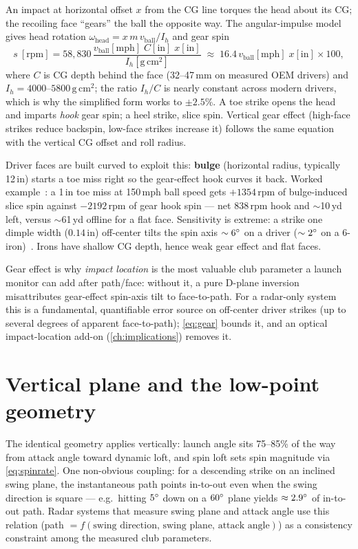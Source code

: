 An impact at horizontal offset $x$ from the CG line torques the head about
its CG; the recoiling face ``gears'' the ball the opposite way. The
angular-impulse model~\cite{tutelmangear} gives head rotation
$\omega_{\mathrm{head}} = x\,m\,v_{\mathrm{ball}}/I_h$ and gear spin
\begin{equation}
\label{eq:gear}
s\ [\mathrm{rpm}] = 58{,}830\,
  \frac{v_{\mathrm{ball}}[\mathrm{mph}]\; C[\mathrm{in}]\;
        x[\mathrm{in}]}{I_h[\mathrm{g\,cm^2}]}
\;\approx\; 16.4\, v_{\mathrm{ball}}[\mathrm{mph}]\;
   x[\mathrm{in}] \times 100,
\end{equation}
where $C$ is CG depth behind the face (32--47\,mm on measured OEM drivers)
and $I_h = 4000$--$5800\,\mathrm{g\,cm^2}$; the ratio $I_h/C$ is nearly
constant across modern drivers, which is why the simplified form works to
$\pm2.5\%$. A toe strike opens the head and imparts \emph{hook} gear spin;
a heel strike, slice spin. Vertical gear effect (high-face strikes reduce
backspin, low-face strikes increase it) follows the same equation with the
vertical CG offset and roll radius.

Driver faces are built curved to exploit this: \textbf{bulge} (horizontal
radius, typically 12\,in) starts a toe miss right so the gear-effect hook
curves it back. Worked example~\cite{tutelmangear}: a 1\,in toe miss at
150\,mph ball speed gets $+1354$\,rpm of bulge-induced slice spin against
$-2192$\,rpm of gear hook spin --- net 838\,rpm hook and $\sim$10\,yd left,
versus $\sim$61\,yd offline for a flat face. Sensitivity is extreme: a
strike one dimple width ($0.14$\,in) off-center tilts the spin axis
$\sim6\si{\degree}$ on a driver ($\sim2\si{\degree}$ on a 6-iron)~\cite{perfectgolfswing}.
Irons have shallow CG depth, hence weak gear effect and flat faces.

\begin{implication}
Gear effect is why \emph{impact location} is the most valuable club
parameter a launch monitor can add after path/face: without it, a pure
D-plane inversion misattributes gear-effect spin-axis tilt to face-to-path.
For a radar-only system this is a fundamental, quantifiable error
source on off-center driver strikes (up to several degrees of apparent
face-to-path); \cref{eq:gear} bounds it, and an optical impact-location
add-on (\cref{ch:implications}) removes it.
\end{implication}

\section{Vertical plane and the low-point geometry}

The identical geometry applies vertically: launch angle sits 75--85\% of
the way from attack angle toward dynamic loft, and spin loft sets spin
magnitude via \cref{eq:spinrate}. One non-obvious coupling: for a
descending strike on an inclined swing plane, the instantaneous path points
in-to-out even when the swing direction is square --- e.g.\ hitting
$5\si{\degree}$ down on a $60\si{\degree}$ plane yields $\approx2.9\si{\degree}$ of in-to-out
path. Radar systems that measure swing plane and attack angle use this
relation (path $=f(\text{swing direction, swing plane, attack angle})$) as
a consistency constraint among the measured club parameters.
